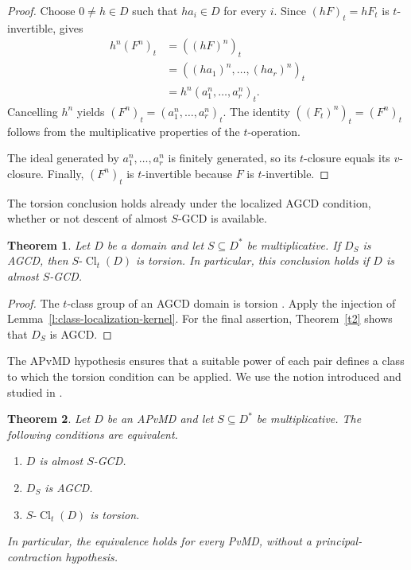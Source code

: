\documentclass[11pt]{amsart}
\newtheorem{theorem}{Theorem}[section]
\theoremstyle{definition}
\theoremstyle{remark}
\DeclareMathOperator{\Cl}{Cl}
\begin{document}
\begin{proof}
Choose $0\ne h\in D$ such that $ha_i\in D$ for every $i$.
Since $(hF)_t=hF_t$ is $t$-invertible,
\cite[Lemma~3.3]{AZ-Bez} gives
\[
\begin{aligned}
 h^n(F^n)_t
 &=((hF)^n)_t \\
 &=((ha_1)^n,\ldots,(ha_r)^n)_t \\
 &=h^n(a_1^n,\ldots,a_r^n)_t.
\end{aligned}
\]
Cancelling $h^n$ yields
$(F^n)_t=(a_1^n,\ldots,a_r^n)_t$.
The identity $((F_t)^n)_t=(F^n)_t$ follows from the
multiplicative properties of the $t$-operation.

The ideal generated by $a_1^n,\ldots,a_r^n$ is finitely generated,
so its $t$-closure equals its $v$-closure.
Finally, $(F^n)_t$ is $t$-invertible because $F$ is
$t$-invertible.
\end{proof}

The torsion conclusion holds already under the localized AGCD
condition, whether or not descent of almost $S$-GCD is available.

\begin{theorem}\label{S-class group is torsion}
\label{c:relative-torsion-weaker-hypothesis}
Let $D$ be a domain and let $S\subseteq D^\ast$ be multiplicative.
If $D_S$ is AGCD, then $S\text{-}\Cl_t(D)$ is torsion.
In particular, this conclusion holds if $D$ is almost $S$-GCD.
\end{theorem}

\begin{proof}
The $t$-class group of an AGCD domain is torsion
\cite[Theorem~3.4]{AZ-Bez}. Apply the injection of
Lemma~\ref{l:class-localization-kernel}.
For the final assertion, Theorem~\ref{t2} shows that $D_S$ is AGCD.
\end{proof}

The APvMD hypothesis ensures that a suitable power of each pair
defines a class to which the torsion condition can be applied.
We use the notion introduced and studied in \cite{LiAPvMD}.

\begin{samepage}
\begin{theorem}\label{t:apvmd-relative-characterization}
\label{t:pvmd-relative-characterization}
Let $D$ be an APvMD and let $S\subseteq D^\ast$ be multiplicative.
The following conditions are equivalent.
\begin{enumerate}
\item $D$ is almost $S$-GCD.
\item $D_S$ is AGCD.
\item $S\text{-}\Cl_t(D)$ is torsion.
\end{enumerate}
In particular, the equivalence holds for every PvMD, without a
principal-contraction hypothesis.
\end{theorem}
\end{samepage}
\end{document}

